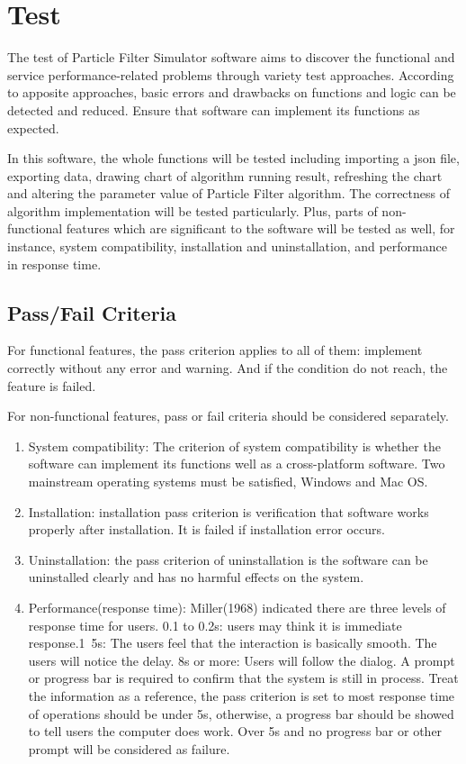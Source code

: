\documentclass[11pt,oneside,a4paper]{article}
\begin{document}
\section{Test}
The test of Particle Filter Simulator software aims to discover the functional and service performance-related problems through variety test approaches. According to apposite approaches, basic errors and drawbacks on functions and logic can be detected and reduced.   Ensure that software can implement its functions as expected.

In this software, the whole functions will be tested including importing a json file, exporting data, drawing chart of algorithm running  result, refreshing the chart and altering the parameter value of Particle Filter algorithm. The correctness of algorithm implementation will be tested particularly. Plus, parts of non-functional features which are significant to the software will be tested as well, for instance, system compatibility, installation and uninstallation, and performance in response time.
\subsection{Pass/Fail Criteria}
For functional features, the pass criterion applies to all of them: implement correctly without any error and warning. And if the condition do not reach, the feature is failed.

For non-functional features, pass or fail criteria should be considered separately.
\begin{enumerate}
  \item System compatibility: The criterion of system compatibility is whether the software can implement its functions well as a cross-platform software. Two mainstream operating systems must be satisfied, Windows and Mac OS.
  \item Installation: installation pass criterion is verification that software works properly after installation. It is failed if installation error occurs.
  \item Uninstallation: the pass criterion of uninstallation is the software can be uninstalled clearly and has no harmful effects on the system.
  \item Performance(response time): Miller(1968) indicated there are three levels of response time for users. 0.1 to 0.2s: users may think it is immediate response.1~5s: The users feel that the interaction is basically smooth. The users will notice the delay. 8s or more: Users will follow the dialog. A prompt or progress bar is required to confirm that the system is still in process. Treat the information as a reference, the pass criterion is set to most response time of operations should be under 5s, otherwise, a progress bar should be showed to tell users the computer does work. Over 5s and no progress bar or other prompt will be considered as failure.

\end{enumerate}
\end{document}
